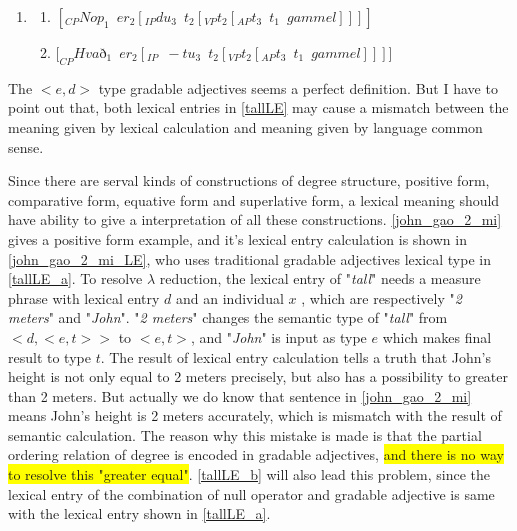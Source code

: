 \documentclass{ctexart}
\begin{document}
\begin{enumerate}[resume]
    \item \label{Icelandic_example_LE}
    
    \begin{enumerate}[ref=(\arabic{enumi}\alph*)]
        \item $[_{CP}Nop_1 \enspace er_2[_{IP}du_3 \enspace t_2[_{VP} t_2[_{AP} t_3 \enspace t_1 \enspace gammel]]]]$
        
        \item $[_{CP}Hva$ð$_1 \enspace er_2[_{IP} \enspace -tu_3 \enspace t_2 [_{VP}t_2[_{AP}t_3 \enspace t_1 \enspace gammel]]]]$
        
    \end{enumerate}   
    
\end{enumerate}

The $<e,d>$ type gradable adjectives seems a perfect definition. But I have to point out that, both lexical entries in \ref{tallLE} may cause a mismatch between the meaning given by lexical calculation and meaning given by language common sense. 

Since there are serval kinds of constructions of degree structure, positive form, comparative form, equative form and superlative form, a lexical meaning should have ability to give a interpretation of all these constructions. \ref{john_gao_2_mi} gives a positive form example, and it's lexical entry calculation is shown in \ref{john_gao_2_mi_LE}, who uses traditional gradable adjectives lexical type in \ref{tallLE_a}. To resolve $\lambda$ reduction, the lexical entry of "\textit{tall}" needs a measure phrase with lexical entry $d$ and an individual $x$ , which are respectively "\textit{2 meters}" and "\textit{John}". "\textit{2 meters}" changes the semantic type of "\textit{tall}" from $<d,<e,t>>$ to $<e,t>$, and "\textit{John}" is input as type $e$ which makes final result to type $t$. The result of lexical entry calculation tells a truth that John's height is not only equal to 2 meters precisely, but also has a possibility to greater than 2 meters. But actually we do know that sentence in \ref{john_gao_2_mi} means John's height is 2 meters accurately, which is mismatch with the result of semantic calculation. The reason why this mistake is made is that the partial ordering relation of degree is encoded in gradable adjectives, \colorbox{yellow}{and there is no way to resolve this "greater equal"}. \ref{tallLE_b} will also lead this problem, since the lexical entry of the combination of null operator and gradable adjective is same with the lexical entry shown in \ref{tallLE_a}.
\end{document}
